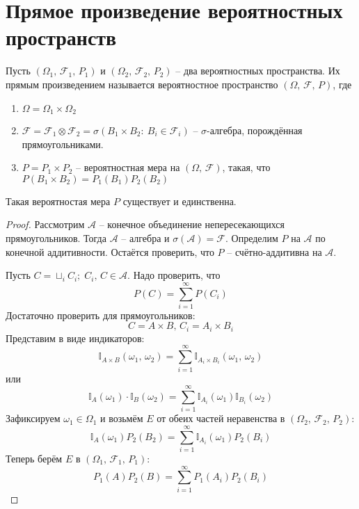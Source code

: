 \section{Прямое произведение вероятностных пространств}
\begin{definition}
	Пусть $(\Omega_1,\, \mathcal{F}_1,\, P_1)$ и $(\Omega_2,\, \mathcal{F}_2,\, P_2)$ -- два вероятностных пространства. Их прямым произведением называется вероятностное пространство $(\Omega,\, \mathcal{F},\, P)$, где
	\begin{enumerate}
		\item $\Omega = \Omega_1 \times \Omega_2$
		\item $\mathcal{F} = \mathcal{F}_1 \otimes \mathcal{F}_2 = \sigma(B_1 \times B_2:\: B_i \in \mathcal{F}_i)$ -- $\sigma$-алгебра, порождённая прямоугольниками.
		\item $P = P_1 \times P_2$ -- вероятностная мера на $(\Omega,\, \mathcal{F})$, такая, что $P(B_1 \times B_2) = P_1(B_1)P_2(B_2)$
	\end{enumerate}
\end{definition}

\begin{lemma}
	Такая вероятностая мера $P$ существует и единственна.
\end{lemma}

\begin{proof}
	Рассмотрим $\mathcal{A}$ -- конечное объединение непересекающихся прямоугольников. Тогда $\mathcal{A}$ -- алгебра и $\sigma(\mathcal{A}) = \mathcal{F}$. Определим $P$ на $\mathcal{A}$ по конечной аддитивности. Остаётся проверить, что $P$ -- счётно-аддитивна на $\mathcal{A}$.

	Пусть $C = \sqcup_i C_i;\; C_i,\,C \in \mathcal{A}$. Надо проверить, что
	\[P(C) = \sum_{i = 1}^\infty P(C_i)\]
	Достаточно проверить для прямоугольников:
	\[C = A \times B,\, C_i = A_i \times B_i\]
	Представим в виде индикаторов:
	\[\mathbb{I}_{A \times B}(\omega_1,\, \omega_2) = \sum_{i = 1}^\infty \mathbb{I}_{A_i \times B_i}(\omega_1,\,\omega_2)\]
	или
	\[\mathbb{I}_A(\omega_1)\cdot\mathbb{I}_B(\omega_2) = \sum_{i = 1}^\infty \mathbb{I}_{A_i}(\omega_1)\mathbb{I}_{B_i}(\omega_2)\]
	Зафиксируем $\omega_1 \in \Omega_1$ и возьмём $E$ от обеих частей неравенства в $(\Omega_2,\, \mathcal{F}_2,\, P_2)$:
	\[\mathbb{I}_A(\omega_1)P_2(B_2) = \sum_{i = 1}^\infty \mathbb{I}_{A_i}(\omega_1)P_2(B_i)\]
	Теперь берём $E$ в $(\Omega_1,\, \mathcal{F}_1,\, P_1)$:
	\[P_1(A)P_2(B) = \sum_{i = 1}^\infty P_1(A_i)P_2(B_i)\]
\end{proof}

